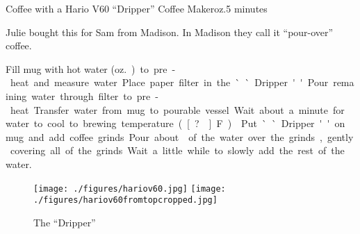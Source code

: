 \begin{recipe}{Coffee with a Hario V60\tm{} ``Dripper'' Coffee Maker}{\unit[6--8]{oz.}}{5 minutes}

\freeform Julie bought this for Sam from Madison.  In Madison they
call it ``pour-over'' coffee.

 Fill mug with hot water
(\unit[6--8]{oz.}) to pre-heat and measure water.  Place paper filter in the
``Dripper.'' Pour remaining water through filter to pre-heat.
Transfer water from mug to pourable vessel.  Wait about a minute for water to cool to brewing temperature (\unit[?\0]{F}).

 Put ``Dripper'' on mug and add coffee
grinds.  Pour about  of the water over the grinds, gently
covering all of the grinds.  Wait a little while to slowly add the
rest of the water.

\end{recipe}
\begin{figure}[b!]
\begin{center}
\texttt{[image: ./figures/hariov60.jpg]}
\hspace{0.1\textwidth}
\texttt{[image: ./figures/hariov60fromtopcropped.jpg]}
\end{center}
\caption*{The ``Dripper'' }
\end{figure}
\clearpage
